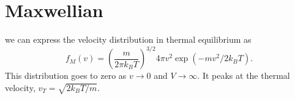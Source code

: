 \section{Maxwellian}
 we can express the velocity distribution in thermal equilibrium as
\begin{equation}
	f_M(v) = (\frac{m}{2\pi k_BT})^{3/2}4\pi v^2\exp{(-mv^2/2k_BT)}.
\end{equation}
This distribution goes to zero as $v\to0$ and $V\to\infty$. It peaks at the thermal velocity, $v_T=\sqrt{2k_BT/m}$.
